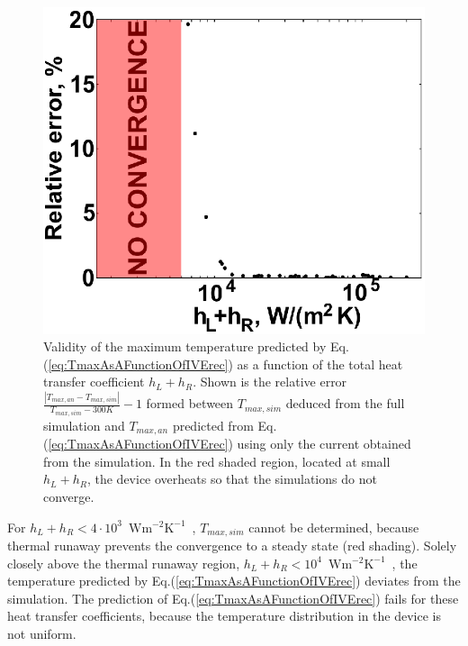 \documentclass[%
9pt,
 aip,
rsi,%
 amsmath,amssymb,
preprint,%
]{revtex4-1}
\newcommand{\hcoefficient}{$\mathrm{W m^{-2} K^{-1}}$}
\begin{document}
\begin{figure}[h]
	\centering
    \includegraphics{General_plots_2.eps}
    \caption{Validity of the maximum temperature predicted by Eq.(\ref{eq:TmaxAsAFunctionOfIVErec}) as a function of the total heat transfer coefficient $h_L + h_R$. Shown is the relative error $\frac{|T_{max,an} - T_{max,sim}| }{T_{max,sim}-300K} - 1$ formed between $T_{max,sim}$ deduced from the full simulation and $T_{max,an}$ predicted from Eq.(\ref{eq:TmaxAsAFunctionOfIVErec}) using only the current obtained from the simulation. In the red shaded region, located at small $h_L + h_R$, the device overheats so that the simulations do not converge.}
    \label{fig:connection_to_experiment}
\end{figure}

For $h_L + h_R < 4\cdot10^3$~\hcoefficient~, $T_{max,sim}$ cannot be determined, because thermal runaway prevents the convergence to a steady state (red shading).
Solely closely above the thermal runaway region, $h_L + h_R < 10^4$~\hcoefficient~, the temperature predicted by Eq.(\ref{eq:TmaxAsAFunctionOfIVErec}) deviates from the simulation. The prediction of Eq.(\ref{eq:TmaxAsAFunctionOfIVErec}) fails for these heat transfer coefficients, because the temperature distribution in the device is not uniform.

\end{document}
